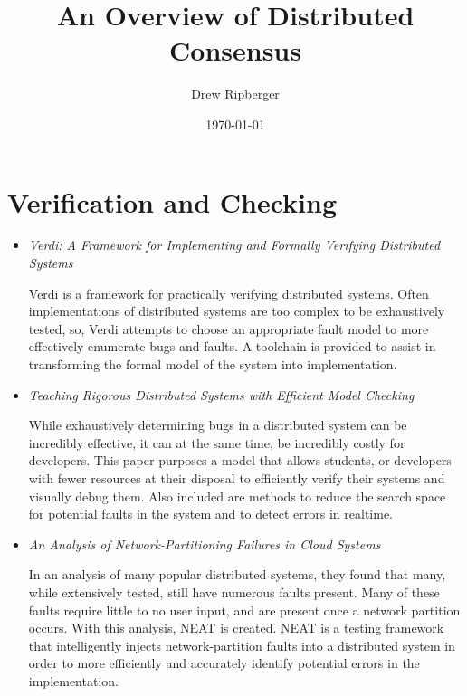 \documentclass{article}
\begin{document}
\title{An Overview of Distributed Consensus}
\author{Drew Ripberger}
\date{\today}
\tableofcontents{}

\maketitle

\section{Verification and Checking}

\begin{itemize}

	\subsection{Analysis and Checking Frameworks}
	
	\item
	\textit{Verdi: A Framework for Implementing and Formally Verifying Distributed Systems} \cite{Verdi}

	Verdi is a framework for practically verifying distributed systems. Often implementations of distributed systems are
	too complex to be exhaustively tested, so, Verdi attempts to choose an appropriate fault model to more effectively enumerate bugs and faults.
	A toolchain is provided to assist in transforming the formal model of the system into implementation.

	\item
	\textit{Teaching Rigorous Distributed Systems with Efficient Model Checking} \cite{MichaelWAET2019}

	While exhaustively determining bugs in a distributed system can be incredibly effective, it can at the same time, be incredibly costly for developers.
	This paper purposes a model that allows students, or developers with fewer resources at their disposal to efficiently verify their systems and visually debug them.
	Also included are methods to reduce the search space for potential faults in the system and to detect errors in realtime.

	\item
	\textit{An Analysis of Network-Partitioning Failures in Cloud Systems} \cite{NEAT}

	In an analysis of many popular distributed systems, they found that many, while extensively tested, still have numerous faults present.
	Many of these faults require little to no user input, and are present once a network partition occurs. With this analysis, NEAT is created.
	NEAT is a testing framework that intelligently injects network-partition faults into a distributed system in order to more efficiently and accurately identify potential errors in the implementation.


\end{itemize}
\end{document}
